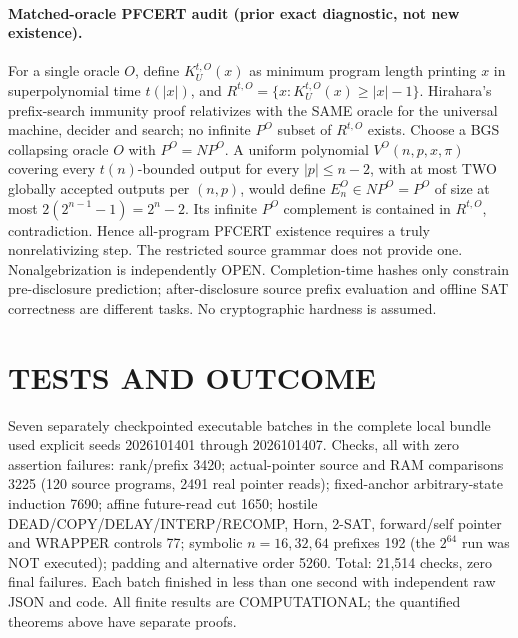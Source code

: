 \documentclass[11pt]{article}
\begin{document}
\paragraph{Matched-oracle PFCERT audit (prior exact diagnostic, not new existence).}
For a single oracle \(O\), define \(K^{t,O}_U(x)\) as minimum program length printing \(x\) in superpolynomial time \(t(|x|)\), and \(R^{t,O}=\{x:K^{t,O}_U(x)\ge |x|-1\}\). Hirahara's prefix-search immunity proof relativizes with the SAME oracle for the universal machine, decider and search; no infinite \(P^O\) subset of \(R^{t,O}\) exists. Choose a BGS collapsing oracle \(O\) with \(P^O=NP^O\). A uniform polynomial \(V^O(n,p,x,\pi)\) covering every \(t(n)\)-bounded output for every \(|p|\le n-2\), with at most TWO globally accepted outputs per \((n,p)\), would define \(E_n^O\in NP^O=P^O\) of size at most \(2(2^{n-1}-1)=2^n-2\). Its infinite \(P^O\) complement is contained in \(R^{t,O}\), contradiction. Hence all-program PFCERT existence requires a truly nonrelativizing step. The restricted source grammar does not provide one. Nonalgebrization is independently OPEN. Completion-time hashes only constrain pre-disclosure prediction; after-disclosure source prefix evaluation and offline SAT correctness are different tasks. No cryptographic hardness is assumed.

\section{TESTS AND OUTCOME}
Seven separately checkpointed executable batches in the complete local bundle used explicit seeds 2026101401 through 2026101407. Checks, all with zero assertion failures: rank/prefix 3420; actual-pointer source and RAM comparisons 3225 (120 source programs, 2491 real pointer reads); fixed-anchor arbitrary-state induction 7690; affine future-read cut 1650; hostile DEAD/COPY/DELAY/INTERP/RECOMP, Horn, 2-SAT, forward/self pointer and WRAPPER controls 77; symbolic \(n=16,32,64\) prefixes 192 (the \(2^{64}\) run was NOT executed); padding and alternative order 5260. Total: 21,514 checks, zero final failures. Each batch finished in less than one second with independent raw JSON and code. All finite results are COMPUTATIONAL; the quantified theorems above have separate proofs.
\end{document}
